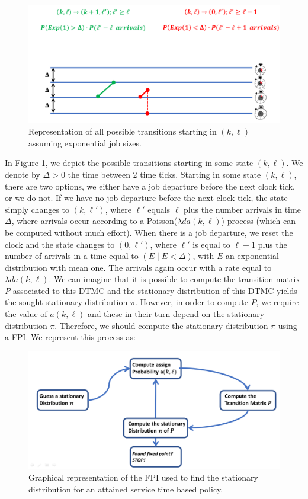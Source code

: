 \documentclass[12pt]{report}
\begin{document}
\begin{figure}[t]
	\centering
	\captionsetup{width=.8\linewidth}
	\includegraphics[width=0.5\linewidth]{figures/Chapter7/transitions.PNG}
	\caption{Representation of all possible transitions starting in $(k,\ell)$ assuming exponential job sizes.}
	\label{fig:transitions_improved}
\end{figure}

In Figure \ref{fig:transitions_improved}, we depict the possible transitions starting in some state $(k, \ell)$. We denote by $\Delta > 0$ the time between 2 time ticks. Starting in some state $(k,\ell)$, there are two options, we either have a job departure before the next clock tick, or we do not. If we have no job departure before the next clock tick, the state simply changes to $(k,\ell')$, where $\ell'$ equals $\ell$ plus the number arrivals in time $\Delta$, where arrivals occur according to a Poisson($\lambda d a(k,\ell)$)  process (which can be computed without much effort). When there is a job departure, we reset the clock and the state changes to $(0, \ell')$, where $\ell'$ is equal to $\ell-1$ plus the number of arrivals in a time equal to $(E \mid E<\Delta)$, with $E$ an exponential distribution with mean one. The arrivals again occur with a rate equal to $\lambda d a(k,\ell)$. We can imagine that it is possible to compute the transition matrix $P$ associated to this DTMC and the stationary distribution of this DTMC yields the sought stationary distribution $\pi$. However, in order to compute $P$, we require the value of $a(k,\ell)$ and these in their turn depend on the stationary distribution $\pi$. Therefore, we should compute the stationary distribution $\pi$ using a FPI. We represent this process as:
\begin{figure}[t]
	\centering
	\captionsetup{width=0.8\linewidth}
	\includegraphics[width=0.8\linewidth]{figures/Chapter7/fixed_point.PNG}
	\caption{Graphical representation of the FPI used to find the stationary distribution for an attained service time based policy.}
	\label{fig:FPI_improved}
\end{figure}
\end{document}

